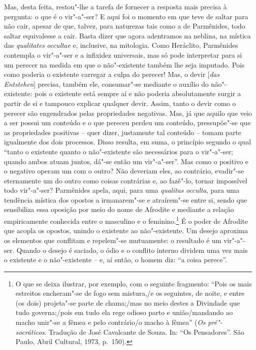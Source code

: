 Mas, desta feita, restou"-lhe a tarefa de fornecer a resposta mais
precisa à pergunta: o que é o vir"-a"-ser? E aqui foi o momento em que
teve de saltar para não cair, apesar de que, talvez, para naturezas
tais como a de Parmênides, todo saltar equivalesse a cair. Basta dizer
que agora adentramos na neblina, na mística das \textit{qualitates}
\textit{occultae} e, inclusive, na mitologia. Como Heráclito, Parmênides
contempla o vir"-a"-ser e a infixidez universais, mas só pode interpretar
para si um perecer na medida em que o não"-existente também lhe seja
imputado. Pois como poderia o existente carregar a culpa do perecer!
Mas, o devir [\textit{das Entstehen}] precisa, também ele, consumar"-se
mediante o auxílio do não"-existente: pois o existente está sempre aí e
não poderia absolutamente surgir a partir de si e tampouco explicar
qualquer devir. Assim, tanto o devir como o perecer são engendrados
pelas propriedades negativas. Mas, já que aquilo que veio a ser possui
um conteúdo e o que pereceu perdeu um conteúdo, pressupõe"-se que as
propriedades positivas -- quer dizer, justamente tal conteúdo -- tomam
parte igualmente dos dois processos. Disso resulta, em suma, o
princípio segundo o qual ``tanto o existente quanto o não"-existente são
necessários para o vir"-a"-ser; quando ambos atuam juntos, dá"-se então um
vir"-a"-ser''. Mas como o positivo e o negativo operam um com o outro? Não
deveriam eles, ao contrário, evadir"-se eternamente um do outro como
coisas contrárias e, ao fazê"-lo, tornar impossível todo vir"-a"-ser?
Parmênides apela, aqui, para uma \textit{qualitas occulta}, para uma
tendência mística dos opostos a irmanarem"-se e atraírem"-se entre si,
sendo que sensibiliza essa oposição por meio do nome de Afrodite e
mediante a relação empiricamente conhecida entre o masculino e o
feminino.\footnote{ O que se deixa ilustrar, por exemplo, com o
seguinte fragmento: ``Pois os mais estreitos encheram"-se de fogo sem
mistura,/e os seguintes, de noite, e entre (os dois) projeta"-se parte
de chama;/mas no meio destes a Divindade que tudo governa;/pois em
tudo ela rege odioso parto e união/mandando ao macho unir"-se a fêmea
e pelo contrário/o macho à fêmea'' (\textit{Os pré"-socráticos}.
Tradução de José Cavalcante de Souza. In: ``Os Pensadores''. São Paulo,
Abril Cultural, 1973, p.~150).} É o poder de Afrodite que acopla
os opostos, unindo o existente ao não"-existente. Um desejo aproxima os
elementos que conflitam e repelem"-se mutuamente: o resultado é um
vir"-a"-ser. Quando o desejo é saciado, o ódio e o conflito interno
dividem uma vez mais o existente e o não"-existente -- e, aí então, o
homem diz: ``a coisa perece''.

